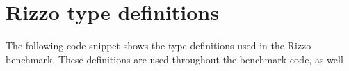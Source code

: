 
\chapter{Rizzo type definitions}\label{appendix:rizzo-type-definitions}

The following code snippet shows the type definitions used in the Rizzo
benchmark. These definitions are used throughout the benchmark code, as well




